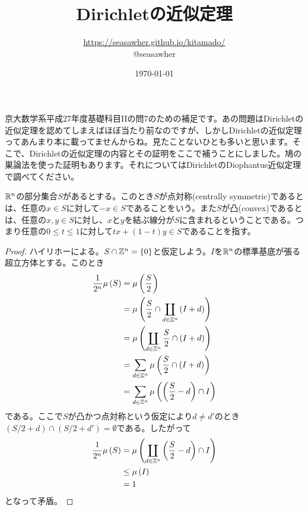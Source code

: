 \documentclass[10pt]{jsarticle}%
\begin{document}
\title{Dirichletの近似定理}
\author{ \url{https://seasawher.github.io/kitamado/}\\ @seasawher}
\date{\today}
\maketitle


京大数学系平成27年度基礎科目IIの問7のための補足です。あの問題はDirichletの近似定理を認めてしまえばほぼ当たり前なのですが、しかしDirichletの近似定理ってあんまり本に載ってませんからね。見たことないひとも多いと思います。そこで、Dirichletの近似定理の内容とその証明をここで補うことにしました。鳩の巣論法を使った証明もあります。それについてはDirichletのDiophantus近似定理で調べてください。




\begin{definition}
${\mathbb R}^n$の部分集合$S$があるとする。このとき$S$が点対称(centrally symmetric)であるとは、任意の$x \in S$に対して$-x \in S$であることをいう。また$S$が凸(convex)であるとは、任意の$x,y \in S$に対し、$x$と$y$を結ぶ線分が$S$に含まれるということである。つまり任意の$0 \leq t \leq 1$に対して$tx + (1-t)y \in S$であることを指す。
\end{definition}

\begin{proof}
ハイリホーによる。$S \cap {\mathbb Z}^n = \{0\}$と仮定しよう。$I$を${\mathbb R}^n$の標準基底が張る超立方体とする。このとき
\begin{align*}
\frac{1}{2^n} \mu \left( S \right) &= \mu\left(\frac{S}{2}\right) \\
&= \mu\left(\frac{S}{2} \cap \coprod_{d \in {\mathbb Z}^n} \left(I + d\right) \right) \\
&= \mu\left( \coprod_{d \in {\mathbb Z}^n}  \frac{S}{2} \cap \left(I + d\right) \right) \\
&= \sum_{d \in {\mathbb Z}^n} \mu\left(   \frac{S}{2} \cap \left(I + d\right) \right) \\
&= \sum_{d \in {\mathbb Z}^n} \mu\left(   \left(\frac{S}{2}- d\right) \cap I \right)
\end{align*}
である。ここで$S$が凸かつ点対称という仮定により$d \neq d'$のとき$(S/2 + d) \cap (S/2 + d') = \emptyset$である。したがって
\begin{align*}
\frac{1}{2^n} \mu\left(S\right) &= \mu\left(   \coprod_{d \in {\mathbb Z}^n} \left(\frac{S}{2}- d\right) \cap I \right) \\
&\leq \mu\left(I\right) \\
&= 1
\end{align*}
となって矛盾。

\end{proof}
\end{document}
